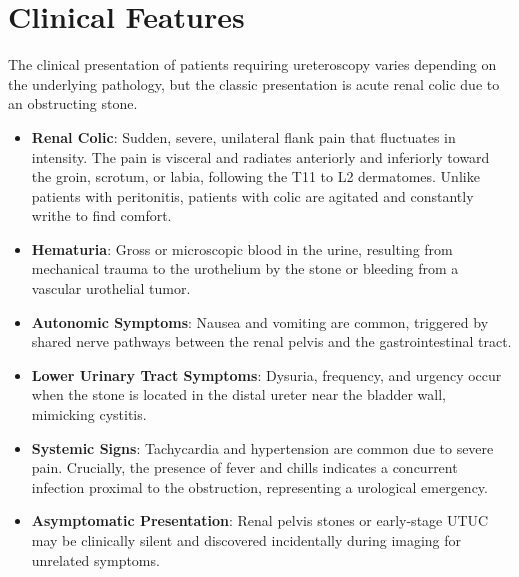 \section*{Clinical Features}
The clinical presentation of patients requiring ureteroscopy varies depending on the underlying pathology, but the classic presentation is acute renal colic due to an obstructing stone.
\begin{itemize}
\item \textbf{Renal Colic}: Sudden, severe, unilateral flank pain that fluctuates in intensity. The pain is visceral and radiates anteriorly and inferiorly toward the groin, scrotum, or labia, following the T11 to L2 dermatomes. Unlike patients with peritonitis, patients with colic are agitated and constantly writhe to find comfort.
\item \textbf{Hematuria}: Gross or microscopic blood in the urine, resulting from mechanical trauma to the urothelium by the stone or bleeding from a vascular urothelial tumor.
\item \textbf{Autonomic Symptoms}: Nausea and vomiting are common, triggered by shared nerve pathways between the renal pelvis and the gastrointestinal tract.
\item \textbf{Lower Urinary Tract Symptoms}: Dysuria, frequency, and urgency occur when the stone is located in the distal ureter near the bladder wall, mimicking cystitis.
\item \textbf{Systemic Signs}: Tachycardia and hypertension are common due to severe pain. Crucially, the presence of fever and chills indicates a concurrent infection proximal to the obstruction, representing a urological emergency.
\item \textbf{Asymptomatic Presentation}: Renal pelvis stones or early-stage UTUC may be clinically silent and discovered incidentally during imaging for unrelated symptoms.
\end{itemize}

